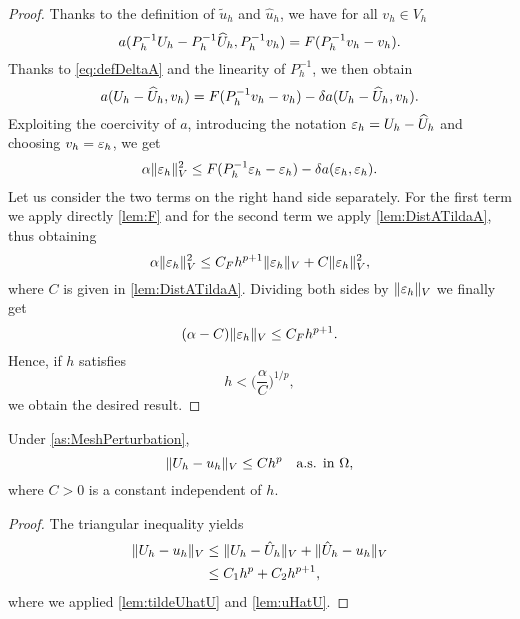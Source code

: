 \documentclass[10pt]{article}
\begin{document}
\begin{proof} Thanks to the definition of $\tilde u_h$ and $\hat u_h$, we have for all $v_h \in V_h$
	\begin{equation}
		a(P_h^{-1} U_h - P_h^{-1} \widehat U_h, P_h^{-1} v_h) = F(P_h^{-1} v_h - v_h).
	\end{equation}	
	Thanks to \eqref{eq:defDeltaA} and the linearity of $P_h^{-1}$, we then obtain
	\begin{equation}
		a(U_h - \widehat U_h, v_h) = F(P_h^{-1} v_h - v_h) - \delta a(U_h - \widehat U_h, v_h).
	\end{equation}
	Exploiting the coercivity of $a$, introducing the notation $\varepsilon_h = U_h - \widehat U_h$ and choosing $v_h = \varepsilon_h$, we get
	\begin{equation}
		\alpha \lVert\varepsilon_h\rVert_V^2 \leq F(P_h^{-1} \varepsilon_h - \varepsilon_h) - \delta a(\varepsilon_h, \varepsilon_h).
	\end{equation}
	Let us consider the two terms on the right hand side separately. For the first term we apply directly \cref{lem:F} and for the second term we apply \cref{lem:DistATildaA}, thus obtaining
	\begin{equation}
		\alpha \lVert\varepsilon_h\rVert_V^2 \leq C_F h^{p+1} \lVert\varepsilon_h\rVert_V + C \lVert\varepsilon_h\rVert_V^2,
	\end{equation}
	where $C$ is given in \cref{lem:DistATildaA}. Dividing both sides by $\lVert\varepsilon_h\rVert_V$ we finally get
	\begin{equation}
		(\alpha - C) \lVert\varepsilon_h\rVert_V \leq C_Fh^{p+1}. 
	\end{equation}
	Hence, if $h$ satisfies
	\begin{equation}
		h < \Big(\frac{\alpha}{C}\Big)^{1/p},
	\end{equation}
	we obtain the desired result.
\end{proof}
\begin{theorem} Under \cref{as:MeshPerturbation}, 
	\begin{equation}
		\lVert U_h - u_h\rVert_V \leq C h^p \quad \text{a.s. in } \Omega,
	\end{equation}
	where $C > 0$ is a constant independent of $h$.
\end{theorem}

\begin{proof} The triangular inequality yields
	\begin{equation}
	\begin{aligned}
	\lVert U_h - u_h\rVert_V &\leq \lVert U_h - \hat U_h\rVert_V + \lVert\hat U_h - u_h\rVert_V \\
	&\leq C_1 h^p + C_2 h^{p+1},
	\end{aligned} 
	\end{equation}
	where we applied \cref{lem:tildeUhatU} and \cref{lem:uHatU}.
\end{proof}
\end{document}
